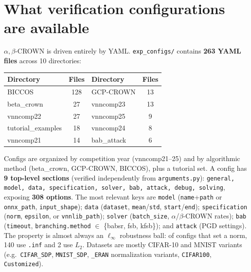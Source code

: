 \documentclass[10pt]{article}
\newcommand{\abc}{$\alpha,\beta$-CROWN}
\begin{document}
\section{What verification configurations are available}
\abc{} is driven entirely by YAML. \texttt{exp\_configs/} contains \textbf{263 YAML files}
across 10 directories:

\begin{table}[H]\centering\small
\begin{tabular}{lc lc}
\toprule
Directory & Files & Directory & Files \\
\midrule
BICCOS & 128 & GCP-CROWN & 13 \\
beta\_crown & 27 & vnncomp23 & 13 \\
vnncomp22 & 27 & vnncomp25 & 9 \\
tutorial\_examples & 18 & vnncomp24 & 8 \\
vnncomp21 & 14 & bab\_attack & 6 \\
\bottomrule
\end{tabular}
\end{table}

Configs are organized by competition year (vnncomp21--25) and by algorithmic method
(beta\_crown, GCP-CROWN, BICCOS), plus a tutorial set. A config has \textbf{9 top-level
sections} (verified independently from \texttt{arguments.py}): \texttt{general, model, data,
specification, solver, bab, attack, debug, solving}, exposing \textbf{308 options}. The most
relevant keys are \texttt{model} (\texttt{name}+\texttt{path} or \texttt{onnx\_path},
\texttt{input\_shape}); \texttt{data} (\texttt{dataset}, \texttt{mean}/\texttt{std},
\texttt{start}/\texttt{end}); \texttt{specification} (\texttt{norm}, \texttt{epsilon}, or
\texttt{vnnlib\_path}); \texttt{solver} (\texttt{batch\_size}, $\alpha$/$\beta$-CROWN rates);
\texttt{bab} (\texttt{timeout}, \texttt{branching.method} $\in$ \{babsr, fsb, kfsb\}); and
\texttt{attack} (PGD settings). The property is almost always an $\ell_\infty$ robustness
ball: of configs that set a norm, 140 use \texttt{.inf} and 2 use $L_2$. Datasets are mostly
CIFAR-10 and MNIST variants (e.g.\ \texttt{CIFAR\_SDP}, \texttt{MNIST\_SDP}, \texttt{\_ERAN}
normalization variants, \texttt{CIFAR100}, \texttt{Customized}).
\end{document}
